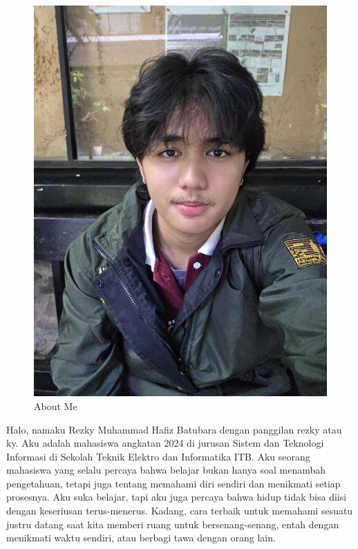 \documentclass[
  letterpaper,
  DIV=11,
  numbers=noendperiod]{scrreprt}
\begin{document}
\begin{figure}[H]

{\centering \includegraphics[width=9.5\linewidth,height=\textheight,keepaspectratio]{All_About_me/../images/RezkyHMIF_KIPP.jpg}

}

\caption{About Me}

\end{figure}%

Halo, namaku Rezky Muhammad Hafiz Batubara dengan panggilan rezky atau
ky. Aku adalah mahasiswa angkatan 2024 di jurusan Sistem dan Teknologi
Informasi di Sekolah Teknik Elektro dan Informatika ITB. Aku seorang
mahasiswa yang selalu percaya bahwa belajar bukan hanya soal menambah
pengetahuan, tetapi juga tentang memahami diri sendiri dan menikmati
setiap prosesnya. Aku suka belajar, tapi aku juga percaya bahwa hidup
tidak bisa diisi dengan keseriusan terus-menerus. Kadang, cara terbaik
untuk memahami sesuatu justru datang saat kita memberi ruang untuk
bersenang-senang, entah dengan menikmati waktu sendiri, atau berbagi
tawa dengan orang lain.
\end{document}
